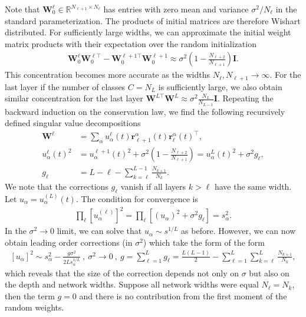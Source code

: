 \documentclass{article} %
\begin{document}
\begin{appendix}
Note that $\bm W^{\ell}_0 \in \mathbb{R}^{N_{\ell+1} \times N_{\ell}}$ has entries with zero mean and variance $\sigma^2/N_{\ell}$ in the standard parameterization. The products of initial matrices are therefore Wishart distributed. For sufficiently large widths, we can approximate the initial weight matrix products with their expectation over the random initialization
\begin{align}
    \bm W^{\ell}_0\bm W^{\ell \top}_0 - \bm W^{\ell + 1 \top}_0 \bm W^{\ell + 1}_0 \approx \sigma^2 \left(1 - \frac{N_{\ell+2}}{N_{\ell+1}} \right) \bm I.
\end{align}
This concentration becomes more accurate as the widths $N_{\ell}, N_{\ell+1} \to \infty$. For the last layer if the number of classes $C = N_L$ is sufficiently large, we also obtain similar concentration for the last layer $\bm W^{L \top} \bm W^{L} \approx \sigma^2 \frac{N_L}{N_{L-1}} \bm I$. Repeating the backward induction on the conservation law, we find the following recursively defined singular value decompositions 
\begin{equation}
    \begin{aligned}
    \bm W^{\ell} &= \sum_{\alpha} u_\alpha^{\ell}(t) \bm r_{\ell+1}^{\alpha}(t) \bm r_{\ell}^{\alpha}(t)^\top,
    \\ u^{\ell}_{\alpha}(t)^2 &= u_{\alpha}^{\ell+1}(t)^2 + \sigma^2 \left( 1 - \frac{N_{\ell+2}}{N_{\ell+1}} \right) = u_{\alpha}^{L}(t)^2 + \sigma^2 g_\ell ,
    \\
    g_{\ell} &= L - \ell - \sum_{k=\ell}^{L-1} \frac{N_{k+1}}{N_k} .
    \end{aligned}
\end{equation}
We note that the corrections $g_\ell$ vanish if all layers $k > \ell$ have the same width. Let $u_{\alpha} = u^{(L)}_{\alpha}(t)$. The condition for convergence is 
\begin{align}
    \prod_{\ell} \left[ u_{\alpha}^{\left(\ell\right)} \right]^2 = \prod_{\ell} \left[ (u_{\alpha})^2 + \sigma^2 g_{\ell} \right] = s_{\alpha}^2.
\end{align}
In the $\sigma^2 \to 0$ limit, we can solve that $u_{\alpha} \sim s^{1/L}$ as before. However, we can now obtain leading order corrections (in $\sigma^2$) which take the form of the form
\begin{align}
    \left[ u_{\alpha} \right]^2 \sim s^{2}_{\alpha} - \frac{g \sigma^2}{2L s_{\alpha}^{1/L}} \ , \ \sigma^2 \to 0  \ , \ g = \sum_{\ell=1}^L g_{\ell} = \frac{L(L-1)}{2} - \sum_{\ell=1}^L \sum_{k=\ell}^{L} \frac{N_{k+1}}{N_k},
\end{align}
which reveals that the size of the correction depends not only on $\sigma$ but also on the depth and network widths. Suppose all network widths were equal $N_{\ell} = N_k$, then the term $g = 0$ and there is no contribution from the first moment of the random weights.


\end{appendix}
\end{document}
